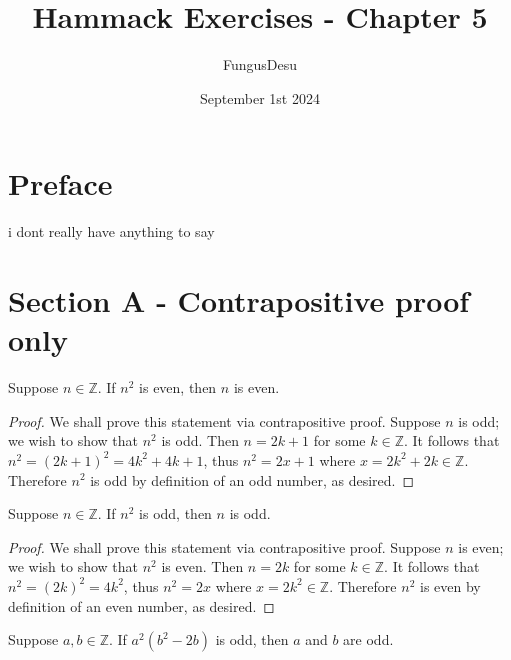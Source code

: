 \documentclass{exam}
\title{Hammack Exercises - Chapter 5}
\author{FungusDesu}
\date{September 1st 2024}
\begin{document}
\maketitle

\section{Preface}
i dont really have anything to say

\section{Section A - Contrapositive proof only}
\begin{proposition}{5.1}
    Suppose $n\in\mathbb Z$. If $n^2$ is even, then $n$ is even.
\end{proposition}

\begin{proof}
    We shall prove this statement via contrapositive proof. Suppose $n$ is odd; we wish to show that $n^2$ is odd. Then $n = 2k + 1$ for some $k\in\mathbb Z$. It follows that $n^2 = (2k + 1)^2 = 4k^2 + 4k + 1$, thus $n^2 = 2x + 1$ where $x = 2k^2 + 2k \in\mathbb Z$. Therefore $n^2$ is odd by definition of an odd number, as desired.
\end{proof}

\begin{proposition}{5.2}
    Suppose $n\in\mathbb Z$. If $n^2$ is odd, then $n$ is odd.
\end{proposition}

\begin{proof}
    We shall prove this statement via contrapositive proof. Suppose $n$ is even; we wish to show that $n^2$ is even. Then $n = 2k$ for some $k\in\mathbb Z$. It follows that $n^2 = (2k)^2 = 4k^2$, thus $n^2 = 2x$ where $x = 2k^2 \in\mathbb Z$. Therefore $n^2$ is even by definition of an even number, as desired.
\end{proof}

\begin{proposition}{5.3}
    Suppose $a, b\in\mathbb Z$. If $a^2(b^2-2b)$ is odd, then $a$ and $b$ are odd.
\end{proposition}
\end{document}
